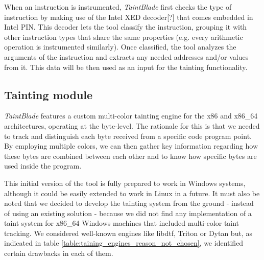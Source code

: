 \documentclass[conference]{IEEEtran}
\begin{document}
When an instruction is instrumented, \textit{TaintBlade} first checks the type
of instruction by making use of the Intel XED decoder[?] that comes embedded in
Intel PIN. This decoder lets the tool classify the instruction, grouping it
with other instruction types that share the same properties (e.g. every
arithmetic operation is instrumented similarly). Once classified, the tool
analyzes the arguments of the instruction and extracts any needed addresses
and/or values from it. This data will be then used as an input for the tainting
functionality.

\subsection{Tainting module}
\textit{TaintBlade} features a custom multi-color tainting engine for the x86
and x86\_64 architectures, operating at the byte-level. The rationale for this is
that we needed to track and distinguish each byte received from a specific code program point.
By employing multiple colors, we can then gather key information regarding how these bytes
are combined between each other and to know how specific bytes are used inside the program.

This initial version of the tool is fully prepared to work in Windows systems,
although it could be easily extended to work in Linux in a future. It must also
be noted that we decided to develop the tainting system from the ground -
instead of using an existing solution - because we did not find any
implementation of a taint system for x86\_64 Windows machines that included
multi-color taint tracking. We considered well-known engines like libdtf,
Triton or Dytan but, as indicated in table
\ref{table:taining_engines_reason_not_chosen}, we identified certain drawbacks
in each of them.
\end{document}
